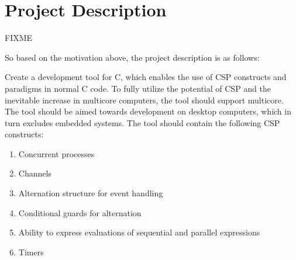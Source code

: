 \setcounter{page}{0}
\newpage
{}
\section*{Project Description}
\label{sec:project_description}

FIXME

So based on the motivation above, the project description is as follows:

Create a development tool for C, which enables the use of CSP constructs and paradigms in normal C code. To fully utilize the potential of CSP and the inevitable increase in multicore computers, the tool should support multicore. The tool should be aimed towards development on desktop computers, which in turn excludes embedded systems. The tool should contain the following CSP constructs:

\begin{enumerate}
    \item Concurrent processes
    \item Channels
    \item Alternation structure for event handling
    \item Conditional guards for alternation
    \item Ability to express evaluations of sequential and parallel expressions
    \item Timers
\end{enumerate}

\afterpage{\blankpage}
